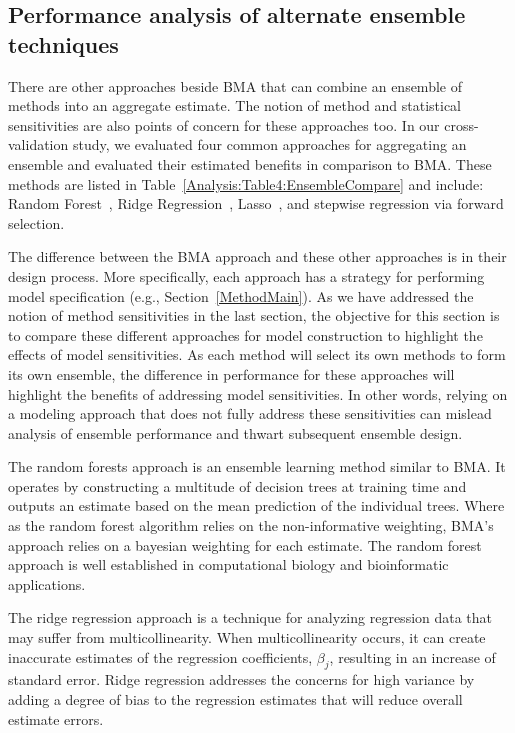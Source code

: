 \documentclass[journal=jpcbfk, manuscript=article]{achemso}
\newcommand{\+}[1]{\ensuremath{\mathbf{#1}}}
\begin{document}
\subsection{Performance analysis of alternate ensemble techniques}
\label{Results:BMA_Variants}
There are other approaches beside BMA that can combine an ensemble of methods into an aggregate estimate.
The notion of method and statistical sensitivities are also points of concern for these approaches too.
In our cross-validation study, we evaluated four common approaches for aggregating an ensemble and evaluated their estimated benefits in comparison to BMA.
These methods are listed in Table~\ref{Analysis:Table4:EnsembleCompare} and include: Random Forest~\cite{Breiman:2001}, Ridge Regression~\cite{Hoerl:2000}, Lasso~\cite{Tibshirani:1994}, and stepwise regression via forward selection.

The difference between the BMA approach and these other approaches is in their design process.
More specifically, each approach has a strategy for performing model specification (e.g., Section~\ref{MethodMain}).
As we have addressed the notion of method sensitivities in the last section, the objective for this section is to compare these different approaches for model construction to highlight the effects of model sensitivities.
As each method will select its own methods to form its own ensemble, the difference in performance for these approaches will highlight the benefits of addressing model sensitivities.
In other words, relying on a modeling approach that does not fully address these sensitivities can mislead analysis of ensemble performance and thwart subsequent ensemble design.

The random forests approach is an ensemble learning method similar to BMA. It operates by constructing a multitude of decision trees at training time and outputs an estimate based on the mean prediction of the individual trees. 
Where as the random forest algorithm relies on the non-informative weighting, BMA's approach relies on a bayesian weighting for each estimate.
The random forest approach is well established in computational biology and bioinformatic applications.

The ridge regression approach is a technique for analyzing regression data that may suffer from multicollinearity. 
When multicollinearity occurs, it can create inaccurate estimates of the regression coefficients, $\beta_j$, resulting in an increase of standard error.
Ridge regression addresses the concerns for high variance by adding a degree of bias to the regression estimates that will reduce overall estimate errors. 
\end{document}
